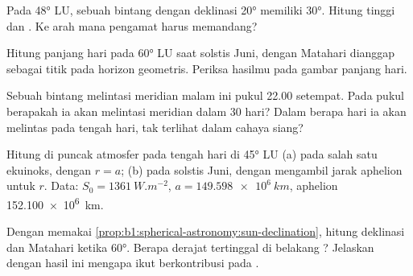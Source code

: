 \begin{exercise}[$\star\star$]\label{exo:b1:spherical-astronomy:6}
Pada  \ang{48} LU, sebuah bintang dengan deklinasi \ang{20} memiliki  \ang{30}. Hitung tinggi dan . Ke arah mana pengamat harus memandang?
\end{exercise}

\begin{exercise}[$\star\star$]\label{exo:b1:spherical-astronomy:7}
Hitung panjang hari pada  \ang{60} LU saat solstis Juni, dengan Matahari dianggap sebagai titik pada horizon geometris. Periksa hasilmu pada gambar panjang hari.
\end{exercise}

\begin{exercise}[$\star\star$]\label{exo:b1:spherical-astronomy:8}
Sebuah bintang melintasi meridian malam ini pukul 22.00  setempat. Pada pukul berapakah ia akan melintasi meridian dalam 30 hari? Dalam berapa hari ia akan melintas pada tengah hari, tak terlihat dalam cahaya siang?
\end{exercise}

\begin{exercise}[$\star\star$]\label{exo:b1:spherical-astronomy:9}
Hitung  di puncak atmosfer pada tengah hari di  \ang{45} LU (a) pada salah satu ekuinoks, dengan $r = a$; (b) pada solstis Juni, dengan mengambil jarak aphelion untuk $r$. Data: $S_0 = \qty{1361}{W.m^{-2}}$, $a = \qty{149.598e6}{km}$, aphelion \qty{152.100e6}{km}.
\end{exercise}

\begin{exercise}[$\star\star\star$]\label{exo:b1:spherical-astronomy:10}
Dengan memakai \cref{prop:b1:spherical-astronomy:sun-declination}, hitung deklinasi dan  Matahari ketika   \ang{60}. Berapa derajat  tertinggal di belakang ? Jelaskan dengan hasil ini mengapa  ikut berkontribusi pada .
\end{exercise}

